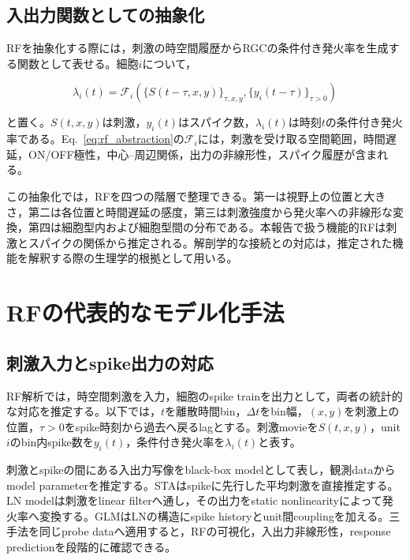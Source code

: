 \documentclass[uplatex,dvipdfmx,a4paper,10pt]{jsarticle}
\begin{document}
\subsection{入出力関数としての抽象化}
\label{subsec:rf_abstraction}

RFを抽象化する際には，刺激の時空間履歴からRGCの条件付き発火率を生成する関数として表せる。細胞\(i\)について，

\begin{equation}
\lambda_i(t)
=
\mathcal{F}_i
\left(
\{S(t-\tau,x,y)\}_{\tau,x,y},
\{y_i(t-\tau)\}_{\tau>0}
\right)
\label{eq:rf_abstraction}
\end{equation}

と置く。\(S(t,x,y)\)は刺激，\(y_i(t)\)はスパイク数，\(\lambda_i(t)\)は時刻\(t\)の条件付き発火率である。Eq.~\eqref{eq:rf_abstraction}の\(\mathcal{F}_i\)には，刺激を受け取る空間範囲，時間遅延，ON/OFF極性，中心--周辺関係，出力の非線形性，スパイク履歴が含まれる。

この抽象化では，RFを四つの階層で整理できる。第一は視野上の位置と大きさ，第二は各位置と時間遅延の感度，第三は刺激強度から発火率への非線形な変換，第四は細胞型内および細胞型間の分布である。本報告で扱う機能的RFは刺激とスパイクの関係から推定される。解剖学的な接続との対応は，推定された機能を解釈する際の生理学的根拠として用いる。


\section{RFの代表的なモデル化手法}
\label{sec:rf_methods}

\subsection{刺激入力とspike出力の対応}
\label{subsec:glm_blackbox}

RF解析では，時空間刺激を入力，細胞のspike trainを出力として，両者の統計的な対応を推定する。以下では，\(t\)を離散時間bin，\(\Delta t\)をbin幅，\((x,y)\)を刺激上の位置，\(\tau>0\)をspike時刻から過去へ戻るlagとする。刺激movieを\(S(t,x,y)\)，unit \(i\)のbin内spike数を\(y_i(t)\)，条件付き発火率を\(\lambda_i(t)\)と表す。

刺激とspikeの間にある入出力写像をblack-box modelとして表し，観測dataからmodel parameterを推定する。STAはspikeに先行した平均刺激を直接推定する。LN modelは刺激をlinear filterへ通し，その出力をstatic nonlinearityによって発火率へ変換する。GLMはLNの構造にspike historyとunit間couplingを加える。三手法を同じprobe dataへ適用すると，RFの可視化，入出力非線形性，response predictionを段階的に確認できる。
\end{document}
